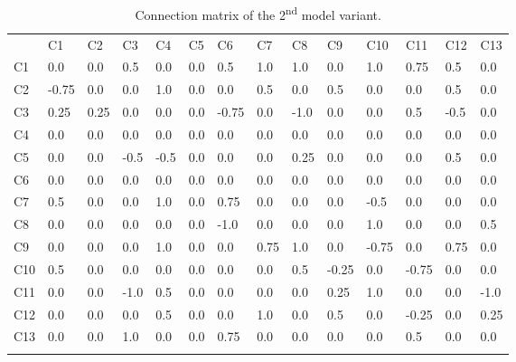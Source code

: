 \documentclass[graybox]{svmult}
\begin{document}
\begin{table}
\caption{Connection matrix of the 2\textsuperscript{nd} model variant.}
\label{tab:V2connectionMtx}
\begin{center}
\begin{tabular}{l|lllllllllllll}
\hline\noalign{\smallskip}
 &      C1 &    C2 &    C3 &    C4 &    C5 &    C6 &    C7 &    C8 &    C9 &    C10 &   C11 &   C12 &   C13\\
\noalign{\smallskip}\hline\noalign{\smallskip}
C1 &    0.0 &   0.0 &   0.5 &   0.0 &   0.0 &   0.5 &   1.0 &   1.0 &   0.0 &   1.0 &   0.75 &  0.5 &   0.0\\
C2 &    -0.75 & 0.0 &   0.0 &   1.0 &   0.0 &   0.0 &   0.5 &   0.0 &   0.5 &   0.0 &   0.0 &   0.5 &   0.0\\
C3 &    0.25 &  0.25 &  0.0 &   0.0 &   0.0 &   -0.75 & 0.0 &   -1.0 &  0.0 &   0.0 &   0.5 &   -0.5 &  0.0\\
C4 &    0.0 &   0.0 &   0.0 &   0.0 &   0.0 &   0.0 &   0.0 &   0.0 &   0.0 &   0.0 &   0.0 &   0.0 &   0.0\\
C5 &    0.0 &   0.0 &   -0.5 &  -0.5 &  0.0 &   0.0 &   0.0 &   0.25 &  0.0 &   0.0 &   0.0 &   0.5 &   0.0\\
C6 &    0.0 &   0.0 &   0.0 &   0.0 &   0.0 &   0.0 &   0.0 &   0.0 &   0.0 &   0.0 &   0.0 &   0.0 &   0.0\\
C7 &    0.5 &   0.0 &   0.0 &   1.0 &   0.0 &   0.75 &  0.0 &   0.0 &   0.0 &   -0.5 &  0.0 &   0.0 &   0.0\\
C8 &    0.0 &   0.0 &   0.0 &   0.0 &   0.0 &   -1.0 &  0.0 &   0.0 &   0.0 &   1.0 &   0.0 &   0.0 &   0.5\\
C9 &    0.0 &   0.0 &   0.0 &   1.0 &   0.0 &   0.0 &   0.75 &  1.0 &   0.0 &   -0.75 & 0.0 &   0.75 &  0.0\\
C10 &   0.5 &   0.0 &   0.0 &   0.0 &   0.0 &   0.0 &   0.0 &   0.5 &   -0.25 & 0.0 &   -0.75 & 0.0 &   0.0\\
C11 &   0.0 &   0.0 &   -1.0 &  0.5 &   0.0 &   0.0 &   0.0 &   0.0 &   0.25 &  1.0 &   0.0 &   0.0 &   -1.0\\
C12 &   0.0 &   0.0 &   0.0 &   0.5 &   0.0 &   0.0 &   1.0 &   0.0 &   0.5 &   0.0 &   -0.25 & 0.0 &   0.25\\
C13 &   0.0 &   0.0 &   1.0 &   0.0 &   0.0 &   0.75 &  0.0 &   0.0 &   0.0 &   0.0 &   0.5 &   0.0 &   0.0\\
\noalign{\smallskip}\hline
\end{tabular}
\end{center}
\end{table}
\end{document}
